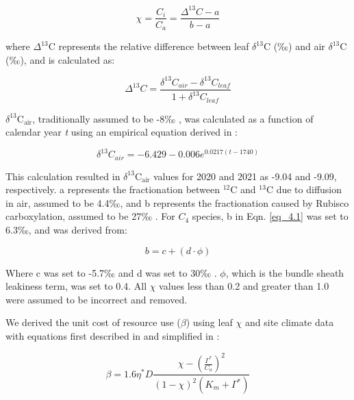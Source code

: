 \begin{equation} 
    \label{eq_4.1}
    \chi=\frac{C_{i}}{C_{a}}=\frac{\Delta^{13}C - a}{b - a}
\end{equation}
    
\noindent where $\Delta^{13}$C represents the relative difference between leaf $\delta^{13}$C (‰) and air $\delta^{13}$C (‰), and is calculated as:

\begin{equation}
    \label{eq_4.2}
    \Delta^{13}C = \frac{\delta^{13}C_{air} - \delta^{13}C_{leaf}}{1 + \delta^{13}C_{leaf}}
\end{equation}

\noindent $\delta^{13}\mathrm{C_{air}}$, traditionally assumed to be -8‰ , was calculated as a function of calendar year \textit{t} using an empirical equation derived in :

\begin{equation}
    \label{eq_4.3}
    \delta^{13}C_{air} = -6.429 - 0.006e^{0.0217(t-1740)}
\end{equation}
    
 \noindent This calculation resulted in $\delta^{13}\mathrm{C_{air}}$ values for 2020 and 2021 as -9.04 and -9.09, respectively. a represents the fractionation between $^{12}\mathrm{C}$ and $^{13}\mathrm{C}$ due to diffusion in air, assumed to be 4.4‰, and b represents the fractionation caused by Rubisco carboxylation, assumed to be 27‰ . For $C_{4}$ species, b in Eqn. \ref{eq_4.1} was set to 6.3‰, and was derived from:

\begin{equation}
    \label{eq_4.4}
    b = c + (d \cdot \phi)
\end{equation}
    
\noindent Where c was set to -5.7‰ and d was set to 30‰ . $\phi$, which is the bundle sheath leakiness term, was set to 0.4. All $\chi$ values less than 0.2 and greater than 1.0 were assumed to be incorrect and removed.
    
We derived the unit cost of resource use ($\beta$) using leaf $\chi$ and site climate data with equations first described in  and simplified in :

\begin{equation}
    \label{eq_4.5}
    \beta = 1.6\eta^{*} D \frac{\chi - (\frac{\Gamma^*}{C_{a}})^{2}}{(1 - \chi)^{2}(K_{m} + \Gamma^{*})}
\end{equation}
    
